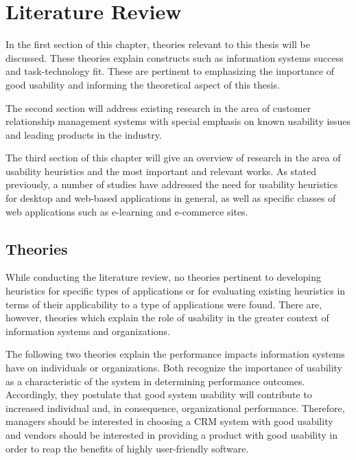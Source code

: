 \chapter{Literature Review}
\label{chap:litrev}
In the first section of this chapter, theories relevant to this thesis will be discussed. These theories explain constructs such as information systems success and task-technology fit. These are pertinent to emphasizing the importance of good usability and informing the theoretical aspect of this thesis.

The second section will address existing research in the area of customer relationship management systems with special emphasis on known usability issues and leading products in the industry.

The third section of this chapter will give an overview of research in the area of usability heuristics and the most important and relevant works. As stated previously, a number of studies \citep[e.g.][]{Molich1990,Leavitt2006,Weiss1994} have addressed the need for usability heuristics for desktop and web-based applications in general, as well as specific classes of web applications such as e-learning and e-commerce sites.

\section{Theories}
\label{sec:theories}
While conducting the literature review, no theories pertinent to developing heuristics for specific types of applications or for evaluating existing heuristics in terms of their applicability to a type of applications were found. There are, however, theories which explain the role of usability in the greater context of information systems and organizations.

The following two theories explain the performance impacts information systems have on individuals or organizations. Both recognize the importance of usability as a characteristic of the system in determining performance outcomes. Accordingly, they postulate that good system usability will contribute to increased individual and, in consequence, organizational performance. Therefore, managers should be interested in choosing a CRM system with good usability and vendors should be interested in providing a product with good usability in order to reap the benefits of highly user-friendly software.

